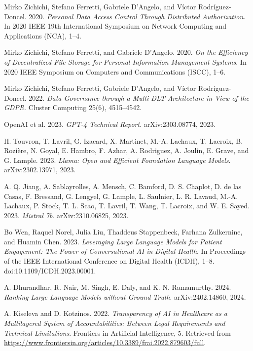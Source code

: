\begin{thebibliography}{55}
Mirko Zichichi, Stefano Ferretti, Gabriele D’Angelo, and Víctor Rodríguez-Doncel. 2020. \emph{Personal Data Access Control Through Distributed Authorization}. In 2020 IEEE 19th International Symposium on Network Computing and Applications (NCA), 1--4.

Mirko Zichichi, Stefano Ferretti, and Gabriele D’Angelo. 2020. \emph{On the Efficiency of Decentralized File Storage for Personal Information Management Systems}. In 2020 IEEE Symposium on Computers and Communications (ISCC), 1--6.

Mirko Zichichi, Stefano Ferretti, Gabriele D’Angelo, and Víctor Rodríguez-Doncel. 2022. \emph{Data Governance through a Multi-DLT Architecture in View of the GDPR}. Cluster Computing 25(6), 4515--4542.

OpenAI et al. 2023. \emph{GPT-4 Technical Report}. arXiv:2303.08774, 2023.

H. Touvron, T. Lavril, G. Izacard, X. Martinet, M.-A. Lachaux, T. Lacroix, B. Rozière, N. Goyal, E. Hambro, F. Azhar, A. Rodriguez, A. Joulin, E. Grave, and G. Lample. 2023. \emph{Llama: Open and Efficient Foundation Language Models}. arXiv:2302.13971, 2023.

A. Q. Jiang, A. Sablayrolles, A. Mensch, C. Bamford, D. S. Chaplot, D. de las Casas, F. Bressand, G. Lengyel, G. Lample, L. Saulnier, L. R. Lavaud, M.-A. Lachaux, P. Stock, T. L. Scao, T. Lavril, T. Wang, T. Lacroix, and W. E. Sayed. 2023. \emph{Mistral 7b}. arXiv:2310.06825, 2023.

Bo Wen, Raquel Norel, Julia Liu, Thaddeus Stappenbeck, Farhana Zulkernine, and Huamin Chen. 2023. \emph{Leveraging Large Language Models for Patient Engagement: The Power of Conversational AI in Digital Health}. In Proceedings of the IEEE International Conference on Digital Health (ICDH), 1--8. doi:10.1109/ICDH.2023.00001.

A. Dhurandhar, R. Nair, M. Singh, E. Daly, and K. N. Ramamurthy. 2024. \emph{Ranking Large Language Models without Ground Truth}. arXiv:2402.14860, 2024.

A. Kiseleva and D. Kotzinos. 2022. \emph{Transparency of AI in Healthcare as a Multilayered System of Accountabilities: Between Legal Requirements and Technical Limitations}. Frontiers in Artificial Intelligence, 5. Retrieved from \url{https://www.frontiersin.org/articles/10.3389/frai.2022.879603/full}.



\end{thebibliography}
